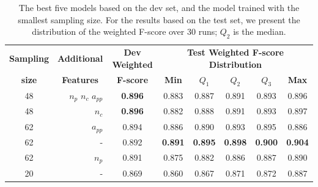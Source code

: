 

\begin{table}[t]
	\centering
	\caption{The best five models based on the dev set, and the model trained with the smallest sampling size.
	 For the results based on the test set, we present the distribution of the weighted F-score over 30 runs; $Q_2$ is the median.}
	\label{table:results}
		\begin{tabular}{crcccccc}
			\toprule
			\multicolumn{1}{c}{\textbf{Sampling}} 	& \multicolumn{1}{c}{\textbf{Additional}} 	& \textbf{Dev Weighted}	& \multicolumn{5}{c}{\textbf{Test Weighted F-score Distribution}} \\
			\multicolumn{1}{c}{\textbf{size}} 		& \multicolumn{1}{c}{\textbf{Features}} 	& \textbf{F-score}		& \textbf{Min}		& $Q_1$ 			& $Q_2$ 			& $Q_3$ 			& \textbf{Max} \\
			\midrule
			48 										& $n_p$ $n_c$ $a_{pp}$ 						& \textbf{0.896} 		& 0.883 			& 0.887 			& 0.891 			& 0.893 			& 0.896\\
			48 										& $n_c$ 									& \textbf{0.896} 		& 0.882 			& 0.888 			& 0.891 			& 0.893 			& 0.897\\
			62 										& $a_{pp}$ 									& 0.894 				& 0.886 			& 0.890 			& 0.893 			& 0.895 			& 0.886\\
			62 										& - 										& 0.892 				& \textbf{0.891} 	& \textbf{0.895} 	& \textbf{0.898} 	& \textbf{0.900} 	& \textbf{0.904}\\
			62 										& $n_p$ 									& 0.891 				& 0.875 			& 0.882 			& 0.886 			& 0.887 			& 0.890\\
			\midrule
			20 										& - 										& 0.869 				& 0.860 			& 0.867 			& 0.871 			& 0.872 				& 0.887\\
			\bottomrule
		\end{tabular}
\end{table}